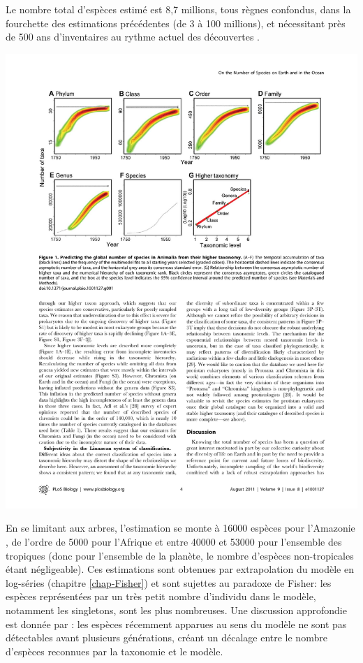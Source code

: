 \documentclass[
  11pt,
  american,
  a4paper,
  extrafontsizes,onecolumn,openright
  ]{memoir}
\begin{document}
Le nombre total d'espèces estimé est 8,7 millions, tous règnes confondus, dans la fourchette des estimations précédentes (de 3 à 100 millions), et nécessitant près de 500 ans d'inventaires au rythme actuel des découvertes \autocite{May2011}.



\scriptsize

\begin{center}\includegraphics[width=0.8\linewidth]{images/Mora2011} \end{center}

\normalsize

En se limitant aux arbres, l'estimation se monte à 16000 espèces pour l'Amazonie \autocite{TerSteege2013}, de l'ordre de 5000 pour l'Afrique et entre 40000 et 53000 pour l'ensemble des tropiques \autocite{Slik2015} (donc pour l'ensemble de la planète, le nombre d'espèces non-tropicales étant négligeable).
Ces estimations sont obtenues par extrapolation du modèle en log-séries (chapitre \ref{chap-Fisher}) et sont sujettes au paradoxe de Fisher: les espèces représentées par un très petit nombre d'individu dans le modèle, notamment les singletons, sont les plus nombreuses.
Une discussion approfondie est donnée par \textcite{Hubbell2015}: les espèces récemment apparues au sens du modèle ne sont pas détectables avant plusieurs générations, créant un décalage entre le nombre d'espèces reconnues par la taxonomie et le modèle.
\end{document}

